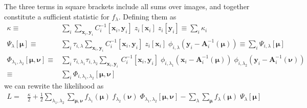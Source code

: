 \documentclass[DM,authoryear,toc]{lsstdoc}
\begin{document}
The three terms in square brackets include all sums over images, and together constitute a sufficient statistic for $f_\lambda$.
Defining them as
\begin{align}
    \kappa \equiv &
        \sum_{i}
            \sum_{\bm{x}_i,\bm{y}_i}
                C_i^{-1}[\bm{x}_i, \bm{y}_i]
                \;z_i[\bm{x}_i]
                \;z_i[\bm{y}_i]
        \equiv \sum_{i} \kappa_i
    \\
    \Psi_{\lambda}[\bm{\mu}] \equiv &
        \sum_{i}
        \tau_{i,\lambda}
        \sum_{\bm{x}_i,\bm{y}_i}
            C_i^{-1}[\bm{x}_i, \bm{y}_i]
            \; z_i[\bm{x}_i]
            \; \phi_{i,\lambda}\!\left(
                \bm{y}_i - \bm{A}_i^{-1}(\bm{\mu})
            \right)
        \equiv \sum_{i} \Psi_{i,\lambda}[\bm{\mu}]
    \\
    \Phi_{\lambda_1,\lambda_2}[\bm{\mu},\bm{\nu}] \equiv &
        \sum_{i}
            \tau_{i,\lambda_1}
            \tau_{i,\lambda_2}
        \sum_{\bm{x}_i,\bm{y}_i}
            \,C_i^{-1}[\bm{x}_i, \bm{y}_i]
            \; \phi_{i,\lambda_1}\!\left(
                    \bm{x}_i - \bm{A}_i^{-1}(\bm{\mu})
            \right)
            \; \phi_{i,\lambda_2}\!\left(
                \bm{y}_i - \bm{A}_i^{-1}(\bm{\nu})
            \right)
    \nonumber\\
    \equiv & \sum_{i} \Phi_{i,\lambda_1,\lambda_2}[\bm{\mu},\bm{\nu}]
\end{align}
we can rewrite the likelihood as
\begin{align}
L =&
    \frac{\kappa}{2}
+
    \frac{1}{2}
    \sum_{\lambda_1,\lambda_2}
    \sum_{\bm{\mu},\bm{\nu}}
    f_{\lambda_1}(\bm{\mu}) \;
    f_{\lambda_2}(\bm{\nu}) \;
    \Phi_{\lambda_1,\lambda_2}[\bm{\mu},\bm{\nu}]
-
    \sum_{\lambda}
    \sum_{\bm{\mu}}
    f_{\lambda}(\bm{\mu})
    \;\Psi_{\lambda}[\bm{\mu}]
\end{align}
\end{document}
